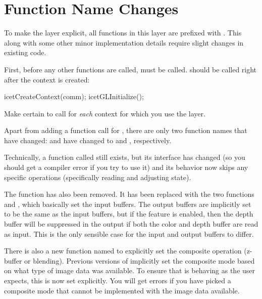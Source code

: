 \section{Function Name Changes}
\label{sec:Transitioning:Function_Name_Changes}

To make the \OpenGL layer explicit, all functions in this layer are prefixed
with .  This along with some other minor implementation
details require slight changes in existing code.

First, before any other  functions are called,
 must be called.   should
be called right after the context is created:
\begin{code}
icetCreateContext(comm);
icetGLInitialize();
\end{code}

Make certain to call  for \emph{each} context for
which you use the \OpenGL layer.

Apart from adding a function call for , there are
only two function names that have changed:
 and  have
changed to  and ,
respectively.

Technically, a function called  still exists, but its
interface has changed (so you should get a compiler error if you try to use
it) and its behavior now skips any \OpenGL specific operations (specifically
reading and adjusting \OpenGL state).

The function 
has also been removed.  It has been replaced with the two functions
 and , which basically
set the input buffers.  The output buffers are implicitly set to be the
same as the input buffers, but if the 
feature is enabled, then the depth buffer will be suppressed in the output
if both the color and depth buffer are read as input.  This is the only
sensible case for the input and output buffers to differ.

There is also a new function named  to explicitly
set the composite operation (z-buffer or blending).  Previous versions of
\IceT implicitly set the composite mode based on what type of image data
was available.  To ensure that \IceT is behaving as the user expects, this
is now set explicitly.  You will get errors if you have picked a composite
mode that cannot be implemented with the image data available.

